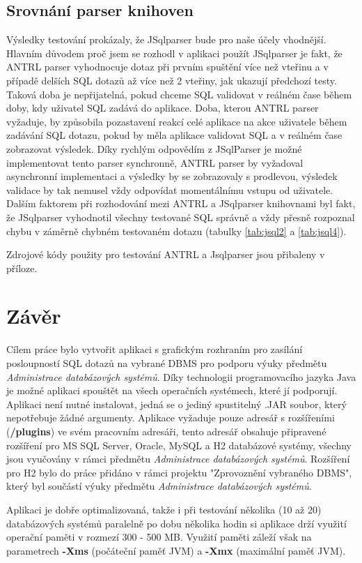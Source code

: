 \documentclass[czech,bachelor,public,dept460,male,cpdeclaration,twoside]{diploma}
\begin{document}
\subsection{Srovnání parser knihoven}
Výsledky testování prokázaly, že JSqlparser bude pro naše účely vhodnější. Hlavním důvodem proč jsem se rozhodl v aplikaci použít JSqlparser je fakt, že ANTRL parser vyhodnocuje dotaz při prvním spuštění více než vteřinu a v případě delších SQL dotazů až více než 2 vteřiny, jak ukazují předchozí testy. Taková doba je nepřijatelná, pokud chceme SQL validovat v reálném čase během doby, kdy uživatel SQL zadává do aplikace. Doba, kterou ANTRL parser vyžaduje, by způsobila pozastavení reakcí celé aplikace na akce uživatele během zadávání SQL dotazu, pokud by měla aplikace validovat SQL a v reálném čase zobrazovat výsledek. Díky rychlým odpovědím z JSqlParser je možné implementovat tento parser synchronně, ANTRL parser by vyžadoval asynchronní implementaci a výsledky by se zobrazovaly s prodlevou, výsledek validace by tak nemusel vždy odpovídat momentálnímu vstupu od uživatele. Dalším faktorem při rozhodování mezi ANTRL a JSqlparser knihovnami byl fakt, že JSqlparser vyhodnotil všechny testované SQL správně a vždy přesně rozpoznal chybu v záměrně chybném testovaném dotazu (tabulky \ref{tab:jsql2} a \ref{tab:jsql4}).


Zdrojové kódy použity pro testování ANTRL a Jsqlparser jsou přibaleny v příloze.


\section{Závěr}
Cílem práce bylo vytvořit aplikaci s grafickým rozhraním pro zasílání posloupností SQL dotazů na vybrané DBMS pro podporu výuky předmětu \textit{Administrace databázových systémů}. Díky technologii programovacího jazyka Java je možné aplikaci spouštět na všech operačních systémech, které jí podporují. Aplikaci není nutné instalovat, jedná se o jediný spustitelný .JAR soubor, který nepotřebuje žádné argumenty. Aplikace vyžaduje pouze  adresář s rozšířeními (\textbf{/plugins}) ve svém pracovním adresáři, tento adresář obsahuje připravené rozšíření pro MS SQL Server, Oracle, MySQL a H2 databázové systémy, všechny jsou vyučovány v rámci předmětu \textit{Administrace databázových systémů}. Rozšíření pro H2 bylo do práce přidáno v rámci projektu "Zprovoznění vybraného DBMS", který byl součástí výuky předmětu \textit{Administrace databázových systémů}.

Aplikaci je dobře optimalizovaná, takže i při testování několika (10 až 20) databázových systémů paralelně po dobu několika hodin si aplikace drží využití operační paměti v rozmezí 300 - 500 MB. Využití paměti záleží však na parametrech \textbf{-Xms} (počáteční paměť JVM) a \textbf{-Xmx} (maximální paměť JVM).
\end{document}
